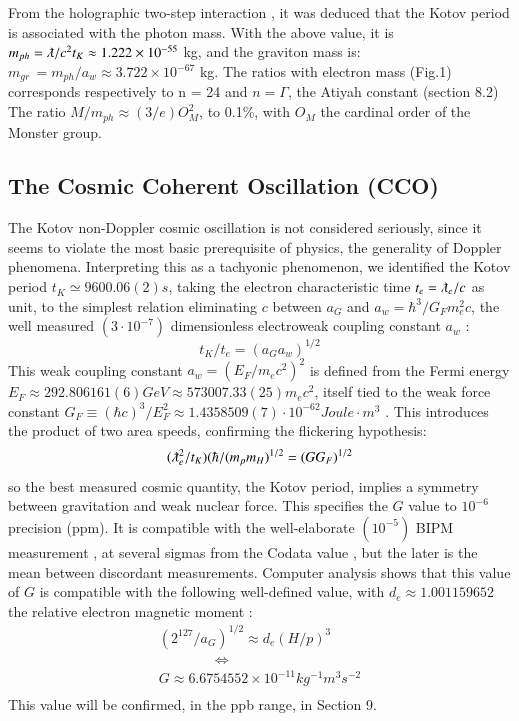 \documentclass[twoside,draft]{article}
\begin{document}
\begin{sloppypar}
From the holographic two-step interaction \cite{Sanchez1}, it was deduced that the Kotov period is associated with the photon mass. With the above value, it is $m_{ph} = \lambdabar/c^{2} t_{K} \approx 1.222 \times 10^{-55}$ kg, and the graviton mass is: 
$m_{gr}\, = m_{ph} /a_{w} \approx 3.722 \times 10^{-67} $ kg.
The ratios with electron mass (Fig.1) corresponds respectively to n = 24 and $n = \Gamma$, the Atiyah constant (section 8.2) The ratio $M/m_{ph} \approx (3/e)O^2_M$, to 0.1\%, with $O_M$ the cardinal order of the Monster group.

\subsection{The Cosmic Coherent Oscillation (CCO)}

The Kotov non-Doppler cosmic oscillation \cite{Sanchez1} is not considered seriously, since it seems to violate the most basic prerequisite of physics, the generality of Doppler phenomena. Interpreting this as a tachyonic phenomenon, we identified the Kotov period $t_{K} \simeq 9600.06(2) s$, taking the electron characteristic time $t_{e} = \lambdabar_{e} /c$ as unit, to the simplest relation eliminating $c$ between $a_{G}$ and $a_{w}=
\hbar^{3} /G_{F} m_{e}^{2} c$, the well measured $(3\cdot 10^{-7})$ dimensionless electroweak coupling constant $a_{w}$ :
\begin{equation}
t_{K} / t_{e} = (a_{G} a_{w})^{1/2}
\end{equation}
This weak coupling constant \cite{Carr} $a_{w} = (E_{F} /m_{e} c^{2} )^{2}$ is defined from the Fermi energy 
$
E_{F} \approx 292.806161(6) GeV \approx 573007.33(25) m_{e} c^{2}
$, itself tied to the weak force constant 
$
G_{F} \equiv (\hbar c)^{3} /E_{F}^{2} \approx
1.4358509(7) \cdot 10^{-62} Joule \cdot m^{3}
$
. This introduces the product of two area speeds, confirming the flickering hypothesis:
\begin{equation}
(\lambdabar_{e}^2/t_{K} )(\hbar/(m_{p} m_{H})^{1/2} = (GG_{F})^{1/2}
\end{equation}
so the best measured cosmic quantity, the Kotov period, implies a symmetry between gravitation and weak nuclear force. This specifies the $G$ value to $10^{-6}$ precision (ppm). It is compatible with the well-elaborate $(10^{-5})$ BIPM measurement \cite{Quinn}, at several sigmas from the Codata value \cite{Tanabashi}, but the later is the mean between discordant measurements. Computer analysis shows that this value of $G$ is compatible with the following well-defined value, with $d_{e} \approx 1.001159652$ the relative electron magnetic moment :
$$\begin{array}{ll}
(2^{127} /a_{G} )^{1/2} \approx d_{e} (H/p)^{3} \\
\qquad  \qquad \Leftrightarrow \\
G \approx 6.6754552 \times 10^{-11} kg^{-1} m^{3} s^{-2} \\
\end{array}$$
This value will be confirmed, in the ppb range, in Section 9.


\end{sloppypar}
\end{document}
